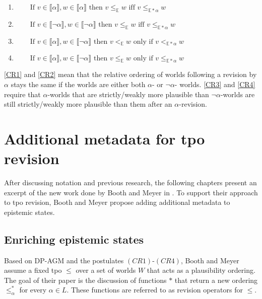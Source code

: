 \documentclass[english, 12pt]{scrartcl}
\theoremstyle{definition}
\theoremstyle{definition}
\theoremstyle{definition}
\newcommand{\modelsOf}[1]{\llbracket #1 \rrbracket}
\begin{document}
\begin{enumerate}[wide=0pt, widest=99,leftmargin=\parindent,label = (CR$\arabic*$)]
    \item\label{CR1} $\qquad \textrm{If } v\in \modelsOf{\alpha}, w \in \modelsOf{\alpha} \textrm{ then } v \leq_{\mathbb{E}} w \textrm{ iff } v \leq_{\mathbb{E\ast\alpha}} w$
    \item\label{CR2} $\qquad \textrm{If } v\in \modelsOf{\neg\alpha}, w \in \modelsOf{\neg\alpha} \textrm{ then } v \leq_{\mathbb{E}} w \textrm{ iff } v \leq_{\mathbb{E\ast\alpha}} w$
    \item\label{CR3} $\qquad \textrm{If } v\in \modelsOf{\alpha}, w \in \modelsOf{\neg\alpha} \textrm{ then } v <_{\mathbb{E}} w \textrm{ only if } v <_{\mathbb{E\ast\alpha}} w$
    \item\label{CR4} $\qquad \textrm{If } v\in \modelsOf{\alpha}, w \in \modelsOf{\neg\alpha} \textrm{ then } v \leq_{\mathbb{E}} w \textrm{ only if } v \leq_{\mathbb{E\ast\alpha}} w$
\end{enumerate}

\ref{CR1} and \ref{CR2} mean that the relative ordering of worlds following a revision by $\alpha$ stays the same if the worlds are either both $\alpha$- or $\neg\alpha$- worlds. \ref{CR3} and \ref{CR4} require that $\alpha$-worlds that are strictly/weakly more plausible than $\neg\alpha$-worlds are still strictly/weakly more plausible than them after an $\alpha$-revision.

\section{Additional metadata for tpo revision}
After discussing notation and previous research, the following chapters present an excerpt of the new work done by Booth and Meyer in \cite{Booth2011}. To support their approach to tpo revision, Booth and Meyer propose adding additional metadata to epistemic states. 

\subsection{Enriching epistemic states}
Based on DP-AGM and the postulates $(CR1)$-$(CR4)$, Booth and Meyer assume a fixed tpo $\leq$ over a set of worlds $W$ that acts as a plausibility ordering. The goal of their paper is the discussion of functions $\ast$ that return a new ordering $\leq_{\alpha}^{\ast}$ for every $\alpha \in L$. These functions are referred to as revision operators for $\leq$.
\end{document}
